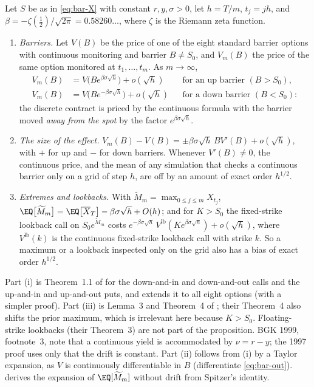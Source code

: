 \begin{proposition}\label{prop:bar-bgk}
Let $S$ be as in \eqref{eq:bar-X} with constant $r,y,\sigma>0$, let $h=T/m$, $t_j=jh$, and
$\beta=-\zeta(\frac12)/\sqrt{2\pi}=0.58260\ldots$, where $\zeta$ is the Riemann zeta function.
\begin{enumerate}[label=(\roman*)]
  \item \emph{Barriers.} Let $V(B)$ be the price of one of the eight standard barrier options
    with continuous monitoring and barrier $B\ne S_0$, and $V_m(B)$ the price of the same option
    monitored at $t_1,\dots,t_m$. As $m\to\infty$,
    \begin{align*}
      V_m(B)&=V\big(Be^{\beta\sigma\sqrt h}\big)+o(\sqrt h)&&\text{for an up barrier }(B>S_0),\\
      V_m(B)&=V\big(Be^{-\beta\sigma\sqrt h}\big)+o(\sqrt h)&&\text{for a down barrier }(B<S_0):
    \end{align*}
    the discrete contract is priced by the continuous formula with the barrier moved
    \emph{away from the spot} by the factor $e^{\beta\sigma\sqrt h}$.
  \item \emph{The size of the effect.} $V_m(B)-V(B)=\pm\beta\sigma\sqrt h\,BV'(B)+o(\sqrt h)$, with $+$
    for up and $-$ for down barriers. Whenever $V'(B)\neq0$, the continuous price, and the mean of
    any simulation that checks a continuous barrier only on a grid of step $h$, are off by an
    amount of exact order $h^{1/2}$.
  \item \emph{Extremes and lookbacks.} With $\widetilde M_m=\max_{0\le j\le m}X_{t_j}$,
    $\EQ\big[\widetilde M_m\big]=\EQ\big[\overline X_T\big]-\beta\sigma\sqrt h+O(h)$; and for $K>S_0$ the
    fixed-strike lookback call on $S_0e^{\widetilde M_m}$ costs
    $e^{-\beta\sigma\sqrt h}\,V^{\mathrm{lb}}(Ke^{\beta\sigma\sqrt h})+o(\sqrt h)$, where $V^{\mathrm{lb}}(k)$ is
    the continuous fixed-strike lookback call with strike $k$. So a maximum or a lookback
    inspected only on the grid also has a bias of exact order $h^{1/2}$.
\end{enumerate}
\end{proposition}

Part (i) is Theorem~1.1 of \textcite{broadie-glasserman-kou} for the down-and-in and
down-and-out calls and the up-and-in and up-and-out puts, and \textcite{kou-2003} extends it
to all eight options (with a simpler proof). Part (iii) is Lemma~3 and Theorem~4 of
\textcite{broadie-glasserman-kou-1999}; their Theorem~4 also shifts the prior maximum, which is
irrelevant here because $K>S_0$. Floating-strike lookbacks (their Theorem~3) are not part of
the proposition. BGK 1999, footnote~3, note that a continuous yield is accommodated by
$\nu=r-y$; the 1997 proof uses only that the drift is constant. Part (ii) follows
from (i) by a Taylor expansion, as $V$ is continuously differentiable in $B$ (differentiate \eqref{eq:bar-out}).
 derives the expansion of $\EQ[\widetilde M_m]$ without drift from
Spitzer's identity.

